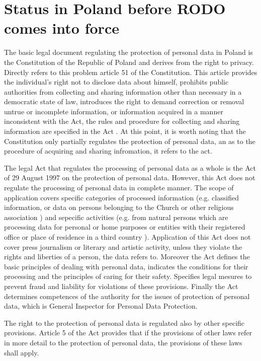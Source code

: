 \documentclass[en, noamssymb]{mgr}
\begin{document}
\section{Status in Poland before RODO comes into force}

The basic legal document regulating the protection of personal data in Poland is the Constitution of the Republic of Poland and derives from the right to privacy. Directly refers to this problem article 51 of the Constitution. This article provides the individual's right not to disclose data about himself, prohibits public authorities from collecting and sharing information other than necessary in a democratic state of law, introduces the right to demand correction or removal untrue or incomplete information, or information acquired in a manner inconsistent with the Act, the rules and procedure for collecting and sharing information are specified in the Act \cite{konstytucja_art51}. At this point, it is worth noting that the Constitution only partially regulates the protection of personal data, an as to the procedure of acquiring and sharing infromation, it refers to the act. 

\indent The legal Act that regulates the processing of personal data as a whole is the Act of 29 August 1997 on the protection of personal data. However, this Act does not regulate the processing of personal data in complete manner. The scope of application covers specific categories of processed information (e.g. classified information, or data on persons belonging to the Church or other religious association \cite{prawo_odo}) and sepecific activities (e.g. from natural persons which are processing data for personal or home purposes or entities with their registered office or place of  residence in a third country \cite{prawo_odo}). Application of this Act does not cover press journalism or literary and artistic activity, unless they violate the rights and liberties of a person, the data refers to. Moreover the Act defines the basic principles of dealing with personal data, indicates the conditions for their processing and the principles of caring for their safety. Specifies legal mesures to prevent fraud and liability for violations of these provisions. Finally the Act determines competences of the authority for the issues of protection of personal data, which is General Inspector for Personal Data Protection.

\indent The right to the protection of personal data is regulated also by other specific provisions. Article 5 of the Act provides that if the provisions of other laws refer in more detail to the protection of personal data, the provisions of these laws shall apply.
\end{document}

